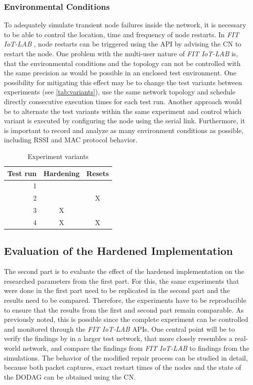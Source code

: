 \documentclass[
  a4paper,
  11pt,
  style=screen,
  extramargin,
  bcor=10mm,
  rgb,
  hyperrefdark,
  abstract=off,
  lnum,
]{tubsartcl}
\newcommand{\fitlab}{\emph{FIT IoT-LAB} }
\begin{document}
\subsubsection{Environmental Conditions}

To adequately simulate transient node failures inside the network, it is necessary to be able to control the location, time and frequency of node restarts.
In \fitlab, node restarts can be triggered using the \ac{API} by advising the \ac{CN} to restart the node.
One problem with the multi-user nature of \fitlab is, that the environmental conditions and the topology can not be controlled with the same precision as would be possible in an enclosed test environment.
One possibility for mitigating this effect may be to change the test variants between experiments (see \autoref{tab:variants}), use the same network topology and schedule directly consecutive execution times for each test run.
Another approach would be to alternate the test variants within the same experiment and control which variant is executed by configuring the node using the serial link.
Furthermore, it is important to record and analyze as many environment conditions as possible, including \ac{RSSI} and \ac{MAC} protocol behavior.

\begin{table}[h]
  \centering
  \caption{Experiment variants}
  \begin{tabular}{r c c}
    \toprule
    Test run & Hardening & Resets \\
    \midrule
    1 & & \\
    2 & & X \\
    3 & X & \\
    4 & X & X \\
    \end{tabular}
  \label{tab:variants}
\end{table}

\subsection{Evaluation of the Hardened Implementation}

The second part is to evaluate the effect of the hardened implementation on the researched parameters from the first part.
For this, the same experiments that were done in the first part need to be replicated in the second part and the results need to be compared.
Therefore, the experiments have to be reproducible to ensure that the results from the first and second part remain comparable.
As previously noted, this is possible since the complete experiment can be controlled and monitored through the \fitlab \acp{API}.
One central point will be to verify the findings by \cite{mueller2017} in a larger test network, that more closely resembles a real-world network, and compare the findings from \fitlab to findings from the simulations.
The behavior of the modified repair process can be studied in detail, because both packet captures, exact restart times of the nodes and the state of the \ac{DODAG} can be obtained using the \ac{CN}.
\end{document}
